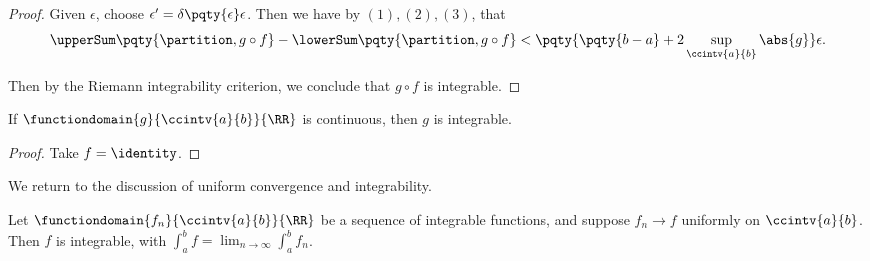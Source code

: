 \begin{proof}
    Given \(\epsilon\), choose \(\epsilon' = \delta\pqty{\epsilon} \epsilon\). Then we have by \((1), (2), (3)\), that
    \[
        \upperSum\pqty{\partition, g \circ f} - \lowerSum\pqty{\partition, g \circ f} < \pqty{\pqty{b - a} + 2 \sup_{\ccintv{a}{b}} \abs{g}} \epsilon.
    \]

    Then by the Riemann integrability criterion, we conclude that \(g \circ f\) is integrable.
\end{proof}

\begin{corollary}
    If \(\functiondomain{g}{\ccintv{a}{b}}{\RR}\) is continuous, then \(g\) is integrable.
\end{corollary}

\begin{proof}
    Take \(f = \identity\).
\end{proof}

We return to the discussion of uniform convergence and integrability.

\begin{theorem}
    \label{thm:uniform-limits-of-integrable-functions-are-integrable}%
    Let \(\functiondomain{f_n}{\ccintv{a}{b}}{\RR}\) be a sequence of integrable functions, and suppose \(f_n \to f\) uniformly on \(\ccintv{a}{b}\). Then \(f\) is integrable, with \(\int_{a}^{b} f = \lim_{n \to \infty} \int_{a}^{b} f_n\).
\end{theorem}

